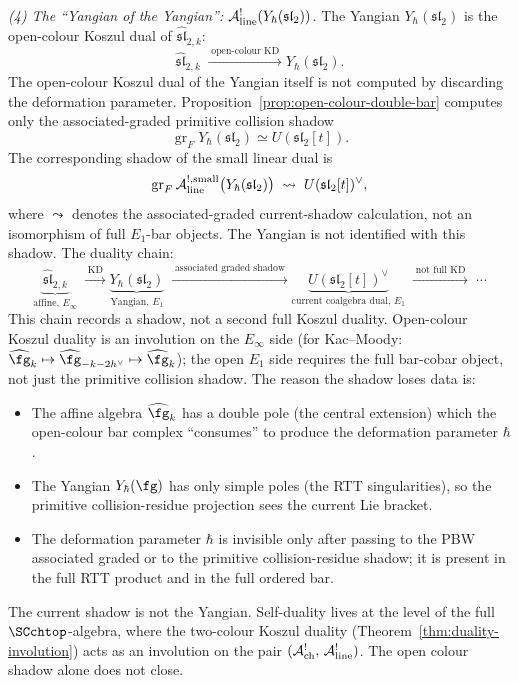 \begin{computation}
\medskip
\noindent\emph{(4) The ``Yangian of the Yangian'':
$\mathcal{A}^!_{\mathrm{line}}(Y_\hbar(\mathfrak{sl}_2))$.}
The Yangian $Y_\hbar(\mathfrak{sl}_2)$ is the open-colour Koszul
dual of $\widehat{\mathfrak{sl}}_{2,k}$:
\[
\widehat{\mathfrak{sl}}_{2,k}
\;\xrightarrow{\;\text{open-colour KD}\;}
Y_\hbar(\mathfrak{sl}_2).
\]
The open-colour Koszul dual of the Yangian itself is not computed by
discarding the deformation parameter.  Proposition~\ref{prop:open-colour-double-bar}
computes only the associated-graded primitive collision shadow
\[
\operatorname{gr}_F Y_\hbar(\mathfrak{sl}_2)
\simeq U(\mathfrak{sl}_2[t]).
\]
The corresponding shadow of the small linear dual is
\begin{equation}\label{eq:yangian-koszul-dual}
\operatorname{gr}_F
\mathcal{A}^{!,\mathrm{small}}_{\mathrm{line}}\bigl(Y_\hbar(\mathfrak{sl}_2)\bigr)
\;\leadsto\;
U(\mathfrak{sl}_2[t])^\vee,
\end{equation}
where \(\leadsto\) denotes the associated-graded current-shadow
calculation, not an isomorphism of full \(E_1\)-bar objects.  The
Yangian is not identified with this shadow. The duality
chain:
\[
\underbrace{\widehat{\mathfrak{sl}}_{2,k}}_{
\text{affine, }E_\infty}
\;\xrightarrow{\;\text{KD}\;}
\underbrace{Y_\hbar(\mathfrak{sl}_2)}_{
\text{Yangian, }E_1}
\;\xrightarrow{\;\text{associated graded shadow}\;}
\underbrace{U(\mathfrak{sl}_2[t])^\vee}_{
\text{current coalgebra dual, }E_1}
\;\xrightarrow{\;\text{not full KD}\;}
\;\cdots
\]
This chain records a shadow, not a second full Koszul duality.
Open-colour Koszul duality is an involution on the $E_\infty$ side
(for Kac--Moody:
$\widehat{\fg}_k \mapsto \widehat{\fg}_{-k-2h^\vee} \mapsto
\widehat{\fg}_k$); the open \(E_1\) side requires the full
bar-cobar object, not just the primitive collision shadow. The reason
the shadow loses data is:
\begin{itemize}[nosep]
\item The affine algebra $\widehat{\fg}_k$ has a
 double pole (the central extension) which the
 open-colour bar complex ``consumes'' to produce the
 deformation parameter $\hbar$.
\item The Yangian $Y_\hbar(\fg)$ has only simple poles
 (the RTT singularities), so the primitive collision-residue
 projection sees the current Lie bracket.
\item The deformation parameter $\hbar$ is invisible only after
 passing to the PBW associated graded or to the primitive
 collision-residue shadow; it is present in the full RTT product and
 in the full ordered bar.
\end{itemize}
The current shadow is not the Yangian.  Self-duality lives at the level of
the full $\SCchtop$-algebra, where the two-colour Koszul duality
(Theorem~\ref{thm:duality-involution}) acts as an involution on
the pair $(\mathcal{A}^!_{\mathrm{ch}},\,\mathcal{A}^!_{\mathrm{line}})$. The open
colour shadow alone does not close.


\end{computation}
